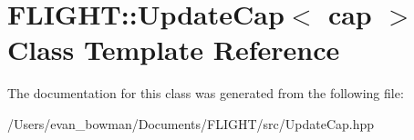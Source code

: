 \hypertarget{class_f_l_i_g_h_t_1_1_update_cap}{}\section{F\+L\+I\+G\+HT\+:\+:Update\+Cap$<$ cap $>$ Class Template Reference}
\label{class_f_l_i_g_h_t_1_1_update_cap}


The documentation for this class was generated from the following file\+:\begin{DoxyCompactItemize}
\item 
/\+Users/evan\+\_\+bowman/\+Documents/\+F\+L\+I\+G\+H\+T/src/Update\+Cap.\+hpp\end{DoxyCompactItemize}
